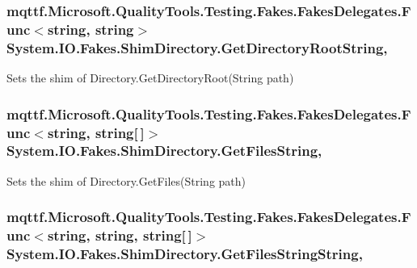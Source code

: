 \hypertarget{class_system_1_1_i_o_1_1_fakes_1_1_shim_directory_a60b9ad4ebb2a4166ee739107a4dac7ca}{
\subsubsection[{Get\-Directory\-Root\-String}]{\setlength{\rightskip}{0pt plus 5cm}mqttf.\-Microsoft.\-Quality\-Tools.\-Testing.\-Fakes.\-Fakes\-Delegates.\-Func$<$string, string$>$ System.\-I\-O.\-Fakes.\-Shim\-Directory.\-Get\-Directory\-Root\-String\hspace{0.3cm}{\ttfamily [static]}, {\ttfamily [set]}}}\label{class_system_1_1_i_o_1_1_fakes_1_1_shim_directory_a60b9ad4ebb2a4166ee739107a4dac7ca}


Sets the shim of Directory.\-Get\-Directory\-Root(\-String path)

\hypertarget{class_system_1_1_i_o_1_1_fakes_1_1_shim_directory_a5cc06d6ba37c30a55e6cc99635cfabeb}{
\subsubsection[{Get\-Files\-String}]{\setlength{\rightskip}{0pt plus 5cm}mqttf.\-Microsoft.\-Quality\-Tools.\-Testing.\-Fakes.\-Fakes\-Delegates.\-Func$<$string, string\mbox{[}$\,$\mbox{]}$>$ System.\-I\-O.\-Fakes.\-Shim\-Directory.\-Get\-Files\-String\hspace{0.3cm}{\ttfamily [static]}, {\ttfamily [set]}}}\label{class_system_1_1_i_o_1_1_fakes_1_1_shim_directory_a5cc06d6ba37c30a55e6cc99635cfabeb}


Sets the shim of Directory.\-Get\-Files(\-String path)

\hypertarget{class_system_1_1_i_o_1_1_fakes_1_1_shim_directory_aa9ee82a1ddf6f377532922b97fe5f256}{
\subsubsection[{Get\-Files\-String\-String}]{\setlength{\rightskip}{0pt plus 5cm}mqttf.\-Microsoft.\-Quality\-Tools.\-Testing.\-Fakes.\-Fakes\-Delegates.\-Func$<$string, string, string\mbox{[}$\,$\mbox{]}$>$ System.\-I\-O.\-Fakes.\-Shim\-Directory.\-Get\-Files\-String\-String\hspace{0.3cm}{\ttfamily [static]}, {\ttfamily [set]}}}\label{class_system_1_1_i_o_1_1_fakes_1_1_shim_directory_aa9ee82a1ddf6f377532922b97fe5f256}


